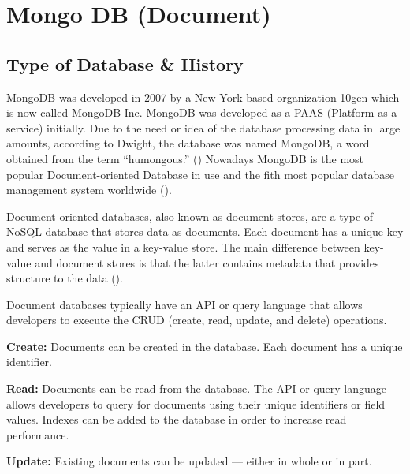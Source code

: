 
\chapter{Mongo DB (Document)} \label{ch:mongo}

\section{Type of Database \& History}
MongoDB was developed in 2007 by a New York-based organization 10gen which is now called MongoDB Inc. MongoDB was developed as a PAAS (Platform as a service) initially.
Due to the need or idea of the database processing data in large amounts, according to Dwight, the database was named MongoDB, a word obtained from the term “humongous.” (\cite{mongodb-History})
Nowadays MongoDB is the most popular Document-oriented Database in use and the fith most popular database management system worldwide (\cite{mongodb-Statista}).

Document-oriented databases, also known as document stores, are a type of NoSQL database that stores data as documents. Each document has a unique key and serves as the value in a key-value store. The main difference between key-value and document stores is that the latter contains metadata that provides structure to the data (\cite{mongodb-Comparison}).

Document databases typically have an API or query language that allows developers to execute the CRUD (create, read, update, and delete) operations.

\textbf{Create:} Documents can be created in the database. Each document has a unique identifier.

\textbf{Read:} Documents can be read from the database. The API or query language allows developers to query for documents using their unique identifiers or field values. Indexes can be added to the database in order to increase read performance.

\textbf{Update:} Existing documents can be updated — either in whole or in part.

